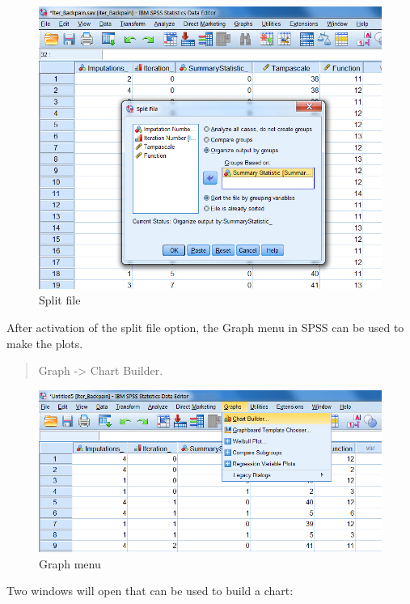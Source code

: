 \documentclass[
]{book}
\begin{document}
\begin{figure}

{\centering \includegraphics[width=0.9\linewidth]{images/fig4.17} 

}

\caption{Split file}\label{fig:fig4-17}
\end{figure}

After activation of the split file option, the Graph menu in SPSS can be
used to make the plots.

\begin{quote}
Graph -\textgreater{} Chart Builder.
\end{quote}

\begin{figure}

{\centering \includegraphics[width=0.9\linewidth]{images/fig4.13} 

}

\caption{Graph menu}\label{fig:fig4-13}
\end{figure}

Two windows will open that can be used to build a chart:
\end{document}
